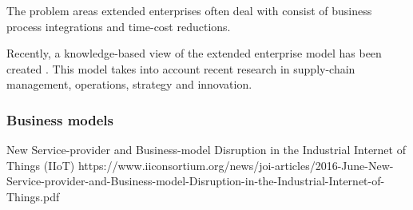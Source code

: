 The problem areas extended enterprises often deal with consist of business process integrations and time-cost reductions. 

Recently, a knowledge-based view of the extended enterprise model has been created \cite{alguezaui2014knowledge}. This model takes into account recent research in supply-chain management, operations, strategy and innovation. 



\subsubsection{Business models}
New Service-provider and Business-model Disruption in the Industrial Internet of Things (IIoT)
https://www.iiconsortium.org/news/joi-articles/2016-June-New-Service-provider-and-Business-model-Disruption-in-the-Industrial-Internet-of-Things.pdf









	



